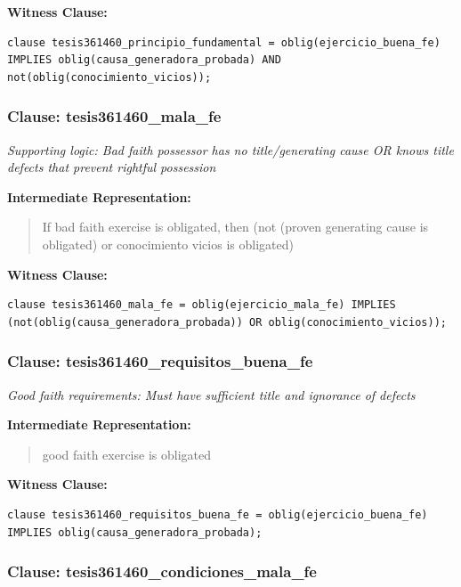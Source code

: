 \documentclass[11pt,a4paper]{article}
\begin{document}
\textbf{Witness Clause:}

\begin{lstlisting}[style=witnessstyle, language=Witness]
clause tesis361460_principio_fundamental = oblig(ejercicio_buena_fe) IMPLIES oblig(causa_generadora_probada) AND not(oblig(conocimiento_vicios));
\end{lstlisting}

\subsubsection{Clause: tesis361460\_mala\_fe}

\textit{Supporting logic: Bad faith possessor has no title/generating cause OR knows title defects that prevent rightful possession}

\textbf{Intermediate Representation:}

\begin{quote}
If bad faith exercise is obligated, then (not (proven generating cause is obligated) or conocimiento vicios is obligated)
\end{quote}

\textbf{Witness Clause:}

\begin{lstlisting}[style=witnessstyle, language=Witness]
clause tesis361460_mala_fe = oblig(ejercicio_mala_fe) IMPLIES (not(oblig(causa_generadora_probada)) OR oblig(conocimiento_vicios));
\end{lstlisting}

\subsubsection{Clause: tesis361460\_requisitos\_buena\_fe}

\textit{Good faith requirements: Must have sufficient title and ignorance of defects}

\textbf{Intermediate Representation:}

\begin{quote}
good faith exercise is obligated
\end{quote}

\textbf{Witness Clause:}

\begin{lstlisting}[style=witnessstyle, language=Witness]
clause tesis361460_requisitos_buena_fe = oblig(ejercicio_buena_fe) IMPLIES oblig(causa_generadora_probada);
\end{lstlisting}

\subsubsection{Clause: tesis361460\_condiciones\_mala\_fe}
\end{document}
